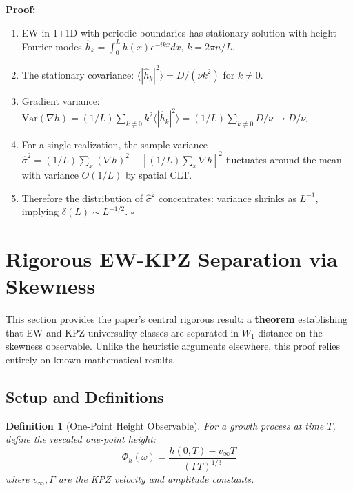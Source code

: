 \documentclass[aps,pre,reprint,amsmath,amssymb,superscriptaddress]{revtex4-2}
\newtheorem{definition}{Definition}
\begin{document}
\textbf{Proof:}
\begin{enumerate}
\item EW in 1+1D with periodic boundaries has stationary solution with height Fourier modes $\hat{h}_k = \int_0^L h(x) e^{-ikx} dx$, $k = 2\pi n/L$.

\item The stationary covariance: $\langle |\hat{h}_k|^2 \rangle = D/(\nu k^2)$ for $k \neq 0$.

\item Gradient variance: $\text{Var}(\nabla h) = (1/L) \sum_{k\neq 0} k^2 \langle |\hat{h}_k|^2 \rangle = (1/L) \sum_{k\neq 0} D/\nu \to D/\nu$.

\item For a single realization, the sample variance $\hat{\sigma}^2 = (1/L) \sum_x (\nabla h)^2 - [(1/L) \sum_x \nabla h]^2$ fluctuates around the mean with variance $O(1/L)$ by spatial CLT.

\item Therefore the distribution of $\hat{\sigma}^2$ concentrates: variance shrinks as $L^{-1}$, implying $\delta(L) \sim L^{-1/2}$. \hfill $\square$
\end{enumerate}

\section{Rigorous EW-KPZ Separation via Skewness}
\label{app:KPZ}

This section provides the paper's central rigorous result: a \textbf{theorem} establishing that EW and KPZ universality classes are separated in $W_1$ distance on the skewness observable. Unlike the heuristic arguments elsewhere, this proof relies entirely on known mathematical results.

\subsection{Setup and Definitions}

\begin{definition}[One-Point Height Observable]
For a growth process at time $T$, define the rescaled one-point height:
\begin{equation}
\Phi_{h}(\omega) = \frac{h(0,T) - v_\infty T}{(\Gamma T)^{1/3}}
\end{equation}
where $v_\infty, \Gamma$ are the KPZ velocity and amplitude constants.
\end{definition}
\end{document}
